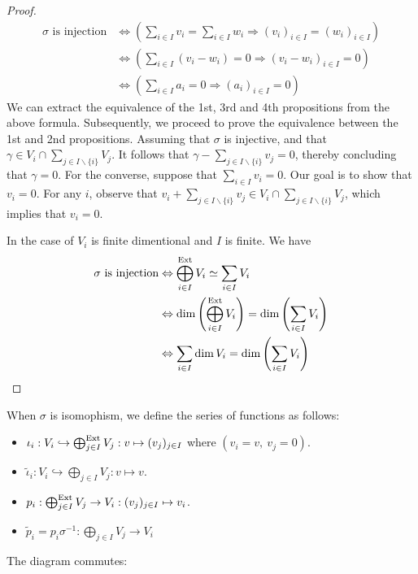 \begin{proof}
    \[
        \begin{aligned}
            \sigma \textrm{ is injection} & \Leftrightarrow \left( \sum_{i \in I} v_i = \sum_{i \in I} w_i \Rightarrow (v_i)_{i \in I} = (w_i)_{i \in I} \right) \\
            & \Leftrightarrow \left( \sum_{i \in I} (v_i - w_i) = 0 \Rightarrow (v_i - w_i)_{i \in I} = 0\right) \\
            & \Leftrightarrow \left( \sum_{i \in I} a_i = 0 \Rightarrow (a_i)_{i \in I} = 0\right)
        \end{aligned} 
   \]
   We can extract the equivalence of the 1st, 3rd and 4th propositions from the above formula. Subsequently, we proceed to prove the equivalence between the 1st and 2nd propositions. Assuming that $\sigma$ is injective, and that $\gamma \in V_i \cap \sum_{j \in I \smallsetminus \{i\}} V_j$. It follows that $\gamma - \sum_{j \in I \smallsetminus \{i\}} v_j = 0$, thereby concluding that $\gamma = 0$. 
   For the converse, suppose that $\sum_{i \in I} v_i = 0$. Our goal is to show that $v_i = 0$. For any $i$, observe that $v_i + \sum_{j \in I \smallsetminus \{i\}} v_j \in V_i \cap \sum_{j \in I \smallsetminus \{i\}} V_j$, which implies that $v_i = 0$.

   

   In the case of $V_i$ is finite dimentional and $I$ is finite. We have
    \begin{align*}
        \sigma \textrm{ is injection} & \Leftrightarrow \bigoplus^{\mathrm{Ext}}_{i \in I} V_i \simeq  \sum_{i \in I} V_i  \\
        & \Leftrightarrow \dim \left( \bigoplus^{\mathrm{Ext}}_{i \in I} V_i \right) = \dim \left( \sum_{i \in I} V_i  \right) \\
        & \Leftrightarrow \sum_{i \in I } \dim V_i = \dim \left( \sum_{i \in I} V_i  \right)
    \end{align*}
\end{proof}






When $\sigma$ is isomophism, we define the series of functions as follows:
\begin{itemize}
    \item $\iota_i: V_i \hookrightarrow \bigoplus^{\mathrm{Ext}}_{j \in I} V_j : v \mapsto (v_j)_{j \in I} $ where $(v_i = v,\ v_j = 0)$.
    \item $\tilde{\iota}_i: V_i \hookrightarrow \bigoplus_{j \in I}V_j : v \mapsto v$.
    \item $p_i : \bigoplus^{\mathrm{Ext}}_{j \in I} V_j \to V_i:  (v_j)_{j \in I} \mapsto v_i$.
    \item $\tilde{p}_i = p_i \sigma^{-1} : \bigoplus_{j \in I}V_j \to V_i$
\end{itemize}
The diagram commutes:

